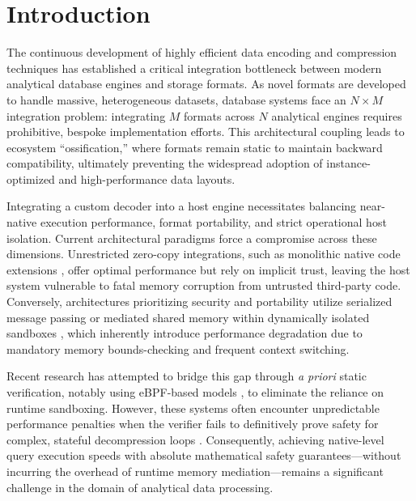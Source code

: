 \documentclass[onecolumn]{IEEEtran}
\numberwithin{equation}{section}
\theoremstyle{definition}
\theoremstyle{remark}
\begin{document}
\section{Introduction}

The continuous development of highly efficient data encoding and compression techniques \cite{boncz2020fsst, kuschewski2023btrblocks} has established a critical integration bottleneck between modern analytical database engines and storage formats. As novel formats are developed to handle massive, heterogeneous datasets, database systems face an $N \times M$ integration problem: integrating $M$ formats across $N$ analytical engines requires prohibitive, bespoke implementation efforts. This architectural coupling leads to ecosystem ``ossification,'' where formats remain static to maintain backward compatibility, ultimately preventing the widespread adoption of instance-optimized and high-performance data layouts.

Integrating a custom decoder into a host engine necessitates balancing near-native execution performance, format portability, and strict operational host isolation. Current architectural paradigms force a compromise across these dimensions. Unrestricted zero-copy integrations, such as monolithic native code extensions \cite{duckdb2025duckdb, haas2012builtin}, offer optimal performance but rely on implicit trust, leaving the host system vulnerable to fatal memory corruption from untrusted third-party code. Conversely, architectures prioritizing security and portability utilize serialized message passing \cite{saur2022containerized} or mediated shared memory within dynamically isolated sandboxes \cite{gienieczko2025anyblox, watt2018mechanising}, which inherently introduce performance degradation due to mandatory memory bounds-checking and frequent context switching.

Recent research has attempted to bridge this gap through \textit{a priori} static verification, notably using eBPF-based models \cite{hedam2023delilah, vishwanathan2023verifying}, to eliminate the reliance on runtime sandboxing. However, these systems often encounter unpredictable performance penalties when the verifier fails to definitively prove safety for complex, stateful decompression loops \cite{sun2024finding}. Consequently, achieving native-level query execution speeds with absolute mathematical safety guarantees---without incurring the overhead of runtime memory mediation---remains a significant challenge in the domain of analytical data processing.
\end{document}
